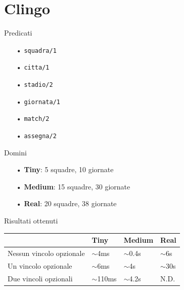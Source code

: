 \documentclass{beamer}
\begin{document}
    \section{Clingo}

    \begin{frame}{Predicati}
        \begin{itemize}
            \LARGE
            \item[•] \texttt{squadra/1}
            \item[•] \texttt{citta/1}
            \item[•] \texttt{stadio/2}
            \item[•] \texttt{giornata/1}
            \item[•] \texttt{match/2}
            \item[•] \texttt{assegna/2}
        \end{itemize}
    \end{frame}

    \begin{frame}{Domini}
        \LARGE
        \begin{itemize}
            \item[•] \textbf{Tiny}: 5 squadre, 10 giornate
            \item[•] \textbf{Medium}: 15 squadre, 30 giornate
            \item[•] \textbf{Real}: 20 squadre, 38 giornate
        \end{itemize}
    \end{frame}

\begin{frame}{Risultati ottenuti}
    \begin{table}[]
        \begin{tabular}{|l|l|l|l|}
        \hline
                                 & Tiny        & Medium     & Real      \\ \hline
        Nessun vincolo opzionale & $\sim$4ms   & $\sim$0.4s & $\sim$6s  \\ \hline
        Un vincolo opzionale     & $\sim$6ms   & $\sim$4s   & $\sim$30s \\ \hline
        Due vincoli opzionali    & $\sim$110ms & $\sim$4.2s & N.D.      \\ \hline
        \end{tabular}
    \end{table}
\end{frame}
\end{document}
